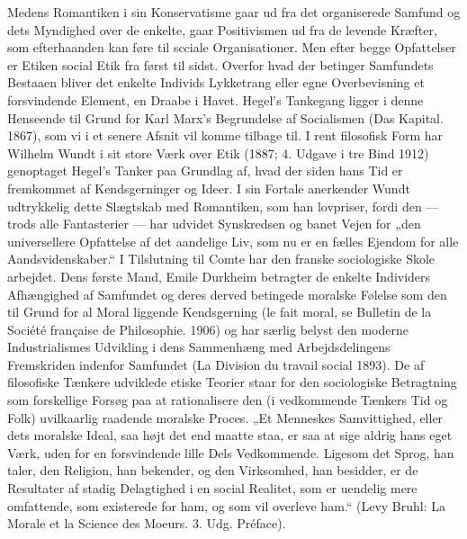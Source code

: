 \documentclass[12pt,a4paper,openany]{book}
\newcommand{\opage}[1]{\marginnote{\footnotesize\textit{[#1]}}}
\begin{document}
Medens Romantiken i sin Konservatisme gaar ud fra det organiserede
Samfund og dets Myndighed over de enkelte, gaar Positivismen
ud fra de levende Kræfter, som efterhaanden kan føre til scciale
Organisationer. Men efter begge Opfattelser er Etiken social
Etik fra først til sidst. Overfor hvad der betinger Samfundets Bestaaen
bliver det enkelte Individs Lykketrang eller egne Overbevisning
et forsvindende Element, en Draabe i Havet. Hegel’s Tankegang
ligger i denne Henseende til Grund for Karl Marx’s Begrundelse
af Socialismen (Das Kapital. 1867), som vi i et senere Afsnit
vil komme tilbage til. I rent filosofisk Form har Wilhelm Wundt i
sit store Værk over Etik (1887; 4. Udgave i tre Bind 1912) genoptaget
Hegel’s Tanker paa Grundlag af, hvad der siden hans Tid er
fremkommet af Kendsgerninger og Ideer. I sin Fortale anerkender
Wundt udtrykkelig dette Slægtskab med Romantiken, som han lovpriser,
fordi den --- trods alle Fantasterier --- har udvidet Synskredsen
og banet Vejen for „den universellere Opfattelse af det aandelige Liv,
som nu er en fælles Ejendom for alle Aandsvidenskaber.“ I Tilslutning
til Comte har den franske sociologiske Skole arbejdet. Dens
første Mand, Emile Durkheim betragter de enkelte Individers Afhængighed
af Samfundet og deres derved betingede moralske Følelse
som den til Grund for al Moral liggende Kendsgerning (le fait
moral, se Bulletin de la Société française de Philosophie. 1906) og
har særlig belyst den moderne Industrialismes Udvikling i dens
\opage{70}Sammenhæng med Arbejdsdelingens Fremskriden indenfor Samfundet
(La Division du travail social 1893). De af filosofiske Tænkere
udviklede etiske Teorier staar for den sociologiske Betragtning som
forskellige Forsøg paa at rationalisere den (i vedkommende Tænkers
Tid og Folk) uvilkaarlig raadende moralske Proces. „Et Menneskes
Samvittighed, eller dets moralske Ideal, saa højt det end
maatte staa, er saa at sige aldrig hans eget Værk, uden for en forsvindende
lille Dels Vedkommende. Ligesom det Sprog, han taler, den
Religion, han bekender, og den Virksomhed, han besidder, er de
Resultater af stadig Delagtighed i en social Realitet, som er uendelig
mere omfattende, som existerede for ham, og som vil overleve ham.“
(Levy Bruhl: La Morale et la Science des Moeurs. 3. Udg. Préface).
\end{document}
